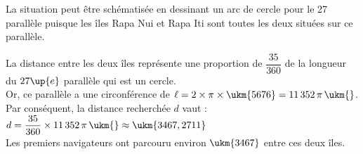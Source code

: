    La situation peut être schématisée en dessinant un arc de cercle pour le 27 parallèle puisque les îles Rapa Nui et Rapa Iti sont toutes les deux situées sur ce parallèle.
   \begin{center}                        
   \end{center}                
   La distance entre les deux îles représente une proportion de $\dfrac{35}{360}$ de la longueur du $27\up{e}$ parallèle qui est un cercle. \\
   Or, ce parallèle a une circonférence de $\ell =2\times\pi\times\ukm{5676} =11\,352\,\pi\,\ukm{}$. \\
   Par conséquent, la distance recherchée $d$ vaut : \\
   $d =\dfrac{35}{360}\times11\,352\,\pi\,\ukm{} \approx \ukm{3467,2711}$ \\                                        
   {\blue Les premiers navigateurs ont parcouru environ $\ukm{3467}$ entre ces deux îles}.

